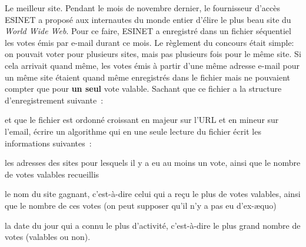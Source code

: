 \begin{Exercice}{Le meilleur site.}
	Pendant le mois de novembre dernier, le fournisseur d’accès ESINET a
	proposé aux internautes du monde entier d’élire le plus beau site du
	\textit{World Wide Web}. Pour ce faire, ESINET a enregistré dans un
	fichier séquentiel  les votes émis par e-mail durant ce mois. Le
	règlement du concours était simple: on pouvait voter pour plusieurs
	sites, mais pas plusieurs fois pour le même site. Si cela arrivait
	quand même, les votes émis à partir d’une même adresse e-mail pour un
	même site étaient quand même enregistrés dans le fichier  mais ne
	pouvaient compter que pour \textbf{un seul} vote valable. Sachant que
	ce fichier a la structure d’enregistrement suivante~:


	et que le fichier est ordonné croissant en majeur sur
	l'URL et en mineur sur l'email,
	écrire un algorithme qui en une seule lecture du fichier écrit les
	informations suivantes~:

	\begin{liste}
		\item 
			les adresses des sites pour lesquels il y a eu au moins un vote, ainsi
			que le nombre de votes valables recueillis 
		\item 
			le nom du site gagnant, c’est-à-dire celui qui a reçu le plus de votes
			valables, ainsi que le nombre de ces votes (on peut supposer qu’il n’y
			a pas eu d’ex-æquo)
		\item 
			la date du jour qui a connu le plus d’activité, c’est-à-dire le plus
			grand nombre de votes (valables ou non).
	\end{liste}
\end{Exercice}	

